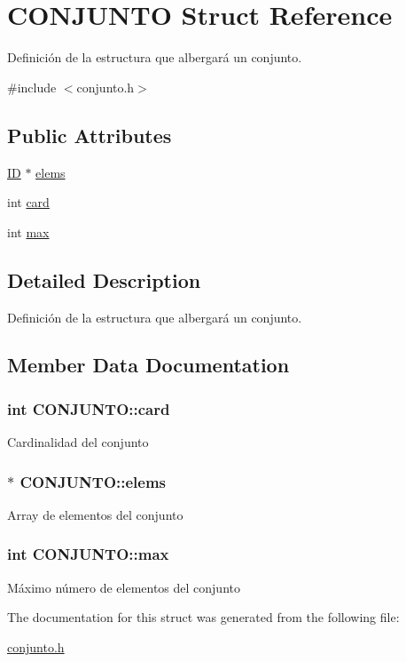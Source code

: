\hypertarget{structCONJUNTO}{
\section{CONJUNTO Struct Reference}
\label{structCONJUNTO}
}


Definición de la estructura que albergará un conjunto.  




{\ttfamily \#include $<$conjunto.h$>$}

\subsection*{Public Attributes}
\begin{DoxyCompactItemize}
\item 
\hyperlink{tipos_8h_a483fb3895d39b2ee95d50073243d077e}{ID} $\ast$ \hyperlink{structCONJUNTO_a2a5dfee7ee27a1abbc0d3dfefd84e479}{elems}
\item 
int \hyperlink{structCONJUNTO_a831d35a1361a60fcd7d7b60ebc8816eb}{card}
\item 
int \hyperlink{structCONJUNTO_a05f12858e3482f5555b17d0d45234986}{max}
\end{DoxyCompactItemize}


\subsection{Detailed Description}
Definición de la estructura que albergará un conjunto. 

\subsection{Member Data Documentation}
\hypertarget{structCONJUNTO_a831d35a1361a60fcd7d7b60ebc8816eb}{
\subsubsection[{card}]{\setlength{\rightskip}{0pt plus 5cm}int {\bf CONJUNTO::card}}}
\label{structCONJUNTO_a831d35a1361a60fcd7d7b60ebc8816eb}
Cardinalidad del conjunto \hypertarget{structCONJUNTO_a2a5dfee7ee27a1abbc0d3dfefd84e479}{
\subsubsection[{elems}]{$\ast$ {\bf CONJUNTO::elems}}}
\label{structCONJUNTO_a2a5dfee7ee27a1abbc0d3dfefd84e479}
Array de elementos del conjunto \hypertarget{structCONJUNTO_a05f12858e3482f5555b17d0d45234986}{
\subsubsection[{max}]{\setlength{\rightskip}{0pt plus 5cm}int {\bf CONJUNTO::max}}}
\label{structCONJUNTO_a05f12858e3482f5555b17d0d45234986}
Máximo número de elementos del conjunto 

The documentation for this struct was generated from the following file:\begin{DoxyCompactItemize}
\item 
\hyperlink{conjunto_8h}{conjunto.h}\end{DoxyCompactItemize}
